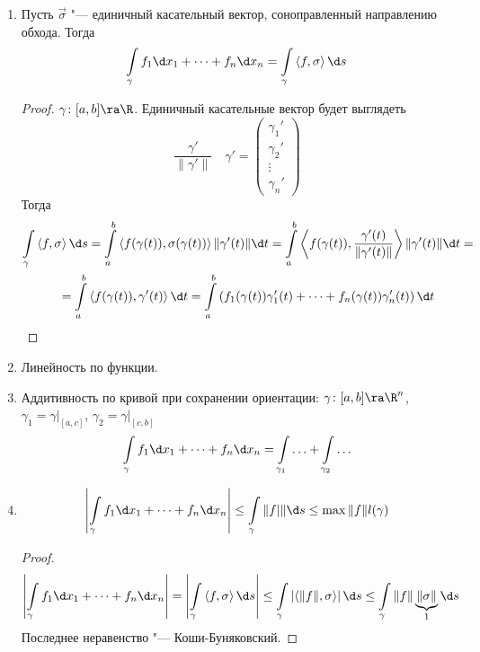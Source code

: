 \begin{enumerate}
\item
	Пусть $\vec\sigma$ "--- единичный касательный вектор, соноправленный направлению обхода.
	Тогда
	\[ \int\limits_\gamma f_1 \d x_1 + \dots + f_n \d x_n = \int\limits_\gamma \left<f, \sigma\right> \d s \]
	\begin{proof}
		$\gamma\colon[a, b] \ra \R$.
		Единичный касательные вектор будет выглядеть
		\[ \frac{\gamma'}{\|\gamma'\|} \quad \gamma' = \begin{pmatrix} \gamma_1' \\ \gamma_2' \\ \vdots \\ \gamma_n' \end{pmatrix} \]
		Тогда
		\begin{gather*}
			\int\limits_\gamma \left<f, \sigma\right> \d s
			= \int\limits_a^b \left<f(\gamma(t)), \sigma(\gamma(t))\right> \|\gamma'(t)\| \d t
			= \int\limits_a^b \left<f(\gamma(t)), \frac{\gamma'(t)}{\|\gamma'(t)\|}\right> \|\gamma'(t)\| \d t = \\
			= \int\limits_a^b \left<f(\gamma(t)), \gamma'(t)\right> \d t
			= \int\limits_a^b \left(f_1(\gamma(t))\gamma'_1(t) + \dots + f_n(\gamma(t))\gamma'_n(t) \right) \d t
		\end{gather*}
	\end{proof}

\item
	Линейность по функции.

\item
	Аддитивность по кривой при сохранении ориентации: $\gamma\colon[a, b] \ra \R^n$, $\gamma_1 = \gamma\bigr|_{[a,c]}$, $\gamma_2 = \gamma\bigr|_{[c, b]}$
	\[ \int\limits_\gamma f_1 \d x_1 + \dots + f_n \d x_n = \int\limits_{\gamma_1} \ldots + \int\limits_{\gamma_2} \ldots \]

\item
	\[ \left| \int\limits_\gamma f_1 \d x_1 + \dots + f_n \d x_n \right| \le \int\limits_\gamma \|f|\| \d s \le \max \|f\| l(\gamma) \]
	\begin{proof}
		\begin{gather*}
			\left| \int\limits_\gamma f_1 \d x_1 + \dots + f_n \d x_n \right|
			= \left| \int\limits_\gamma \left<f, \sigma\right> \d s \right|
			\le \int\limits_\gamma \left|\left<\|f\|, \sigma\right>\right| \d s
			\le \int\limits_\gamma \|f\| \underbrace{\|\sigma\|}_1 \d s
		\end{gather*}
		Последнее неравенство "--- Коши-Буняковский.
	\end{proof}


\end{enumerate}
